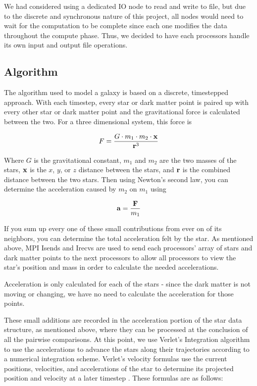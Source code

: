 \documentclass{article}
\begin{document}
We had considered using a dedicated IO node to read and write to file, but due to the discrete and synchronous nature of this project, all nodes would need to wait for the computation to be complete since each one modifies the data throughout the compute phase.  Thus, we decided to have each processors handle its own input and output file operations.

\subsection{Algorithm}

The algorithm used to model a galaxy is based on a discrete, timestepped approach.  With each timestep, every star or dark matter point is paired up with every other star or dark matter point and the gravitational force is calculated between the two.  For a three dimensional system, this force is 

\begin{equation}
F = \frac{G \cdot m_{1} \cdot m_{2} \cdot {\bf x}}{{\bf r}^{3}}
\end{equation}

Where $G$ is the gravitational constant, $m_{1}$ and $m_{2}$ are the two masses of the stars, ${\bf x}$ is the $x$, $y$, or $z$ distance between the stars, and ${\bf r}$ is the combined distance between the two stars.  Then using Newton's second law, you can determine the acceleration caused by $m_{2}$ on $m_{1}$ using

\begin{equation}
{\bf a} = \frac{{\bf F}}{m_{1}}
\end{equation}

If you sum up every one of these small contributions from ever on of its neighbors, you can determine the total acceleration felt by the star.  As mentioned above, MPI Isends and Irecvs are used to send each processors' array of stars and dark matter points to the next processors to allow all processors to view the star's position and mass in order to calculate the needed accelerations.

Acceleration is only calculated for each of the stars - since the dark matter is not moving or changing, we have no need to calculate the acceleration for those points.

These small additions are recorded in the acceleration portion of the star data structure, as mentioned above, where they can be processed at the conclusion of all the pairwise comparisons.  At this point, we use Verlet's Integration algorithm to use the accelerations to advance the stars along their trajectories according to a numerical integration scheme. Verlet's velocity formulas use the current positions, velocities, and accelerations of the star to determine its projected position and velocity at a later timestep \cite{verlet}.  These  formulas are as follows:
          
\end{document}
